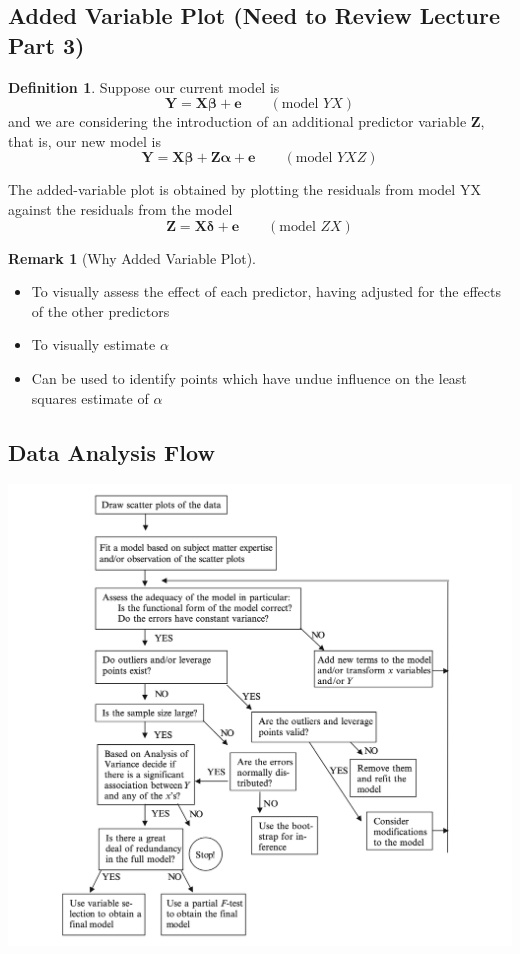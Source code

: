 \documentclass[11pt]{article}
\newcommand\VEC{\bm}{}
\theoremstyle{definition}
\newtheorem{definition}{Definition}[section]
\newtheorem{remark}{Remark}[section]
\numberwithin{equation}{section}
\begin{document}
\subsection{Added Variable Plot (Need to Review Lecture Part 3)}

\begin{definition}
  Suppose our current model is 
  \begin{equation}
    \VEC{Y}=\VEC{X \beta} + \VEC{e}\qquad(\text{model } YX)
  \end{equation}
  and we are considering the introduction of an additional predictor variable $\VEC{Z}$, that is, our new model is
  \begin{equation}
    \VEC{Y}=\VEC{X\beta + Z\alpha + e}\qquad(\text{model }YXZ)
  \end{equation}

  The added-variable plot is obtained by plotting the residuals from model YX against the residuals from the model
  \begin{equation}
    \VEC{Z}=\VEC{X\delta} + \VEC{e}\qquad(\text{model }ZX)
  \end{equation}
\end{definition}

\begin{remark}[Why Added Variable Plot]
 \begin{itemize}
 \item To visually assess the effect of each predictor, having adjusted for the effects of the other predictors
 \item To visually estimate $\alpha$
 \item Can be used to identify points which have undue influence on the least squares estimate of $\alpha$
 \end{itemize} 
\end{remark}

\subsection{Data Analysis Flow}

  \includegraphics[width=\textwidth]{./images/data-analysis-flow}
\end{document}

